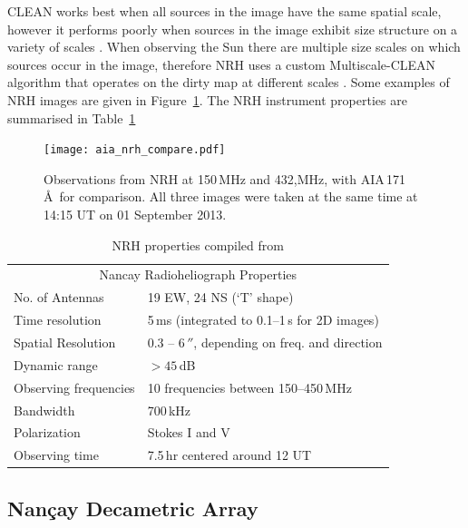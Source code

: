 CLEAN works best when all sources in the image have the same spatial scale, however it performs poorly when sources in the image exhibit size structure on a variety of scales \citep{wakker1998}. When observing the Sun there are multiple size scales on which sources occur in the image, therefore NRH uses a custom Multiscale-CLEAN algorithm that operates on the dirty map at different scales \citep{mercier2006}. Some examples of NRH images are given in Figure~\ref{fig:nrh_obs}. The NRH instrument properties are summarised in Table~\ref{tab:nrh}


\begin{figure}[!t]
\begin{center}
\texttt{[image: aia\_nrh\_compare.pdf]}
\caption[NRH observations]{Observations from NRH at 150\,MHz and 432,MHz, with AIA\,171\,\AA~for comparison. All three images were taken at the same time at 14:15 UT on 01 September 2013.}
\label{fig:nrh_obs}
\end{center}
\end{figure}
\begin{table}[!t]
  \centering
\begin{tabular}{ll}
\hline
\multicolumn{2}{c}{Nancay Radioheliograph Properties} \\
\cline{1-2}
No. of Antennas		 & 19 EW, 24 NS (`T' shape) \\
Time resolution            & 5\,ms (integrated to 0.1--1\,s for 2D images) \\
Spatial Resolution        & 0.3 -- 6\,$''$, depending on freq. and direction \\
Dynamic range   		  & $>45$\,dB \\
Observing frequencies & 10 frequencies between 150--450\,MHz \\
Bandwidth                    & 700\,kHz \\
Polarization                  & Stokes I and V \\
Observing time             & 7.5\,hr centered around 12 UT \\
\hline

\end{tabular}
\caption {NRH properties compiled from \citep{kerdraon1997}}
\label{tab:nrh}
\end{table}




\subsection{Nan\c{c}ay Decametric Array}\label{sec:32}

